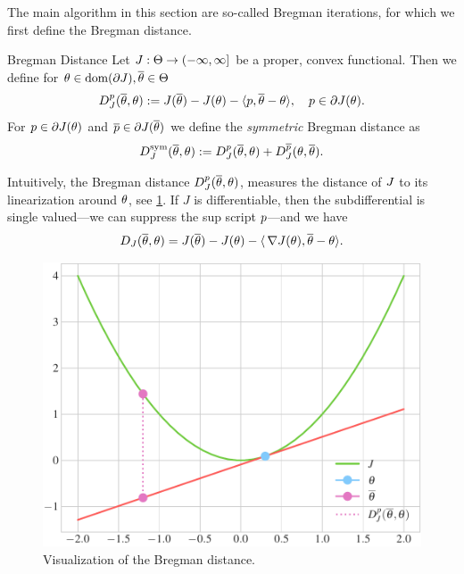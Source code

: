 The main algorithm in this section are so-called Bregman iterations, for which we first define the Bregman distance.
%
\begin{definition}{Bregman Distance}{}
	Let $J:\Theta\to(-\infty,\infty]$ be a proper, convex functional. Then we define for $\theta\in\operatorname{dom}(\partial J),\overline{\theta}\in\Theta$
	\begin{align}\label{eq:bregman_distance}
		D^p_J(\overline{\theta},\theta) := J(\overline {\theta})-J({\theta})-\langle p,\overline{\theta}-{\theta}\rangle,\quad p\in\partial J(\theta).
	\end{align}
	For $p\in\partial J({\theta})$ and $\overline{p}\in\partial J(\overline{\theta})$ we define the \emph{symmetric} Bregman distance as
	\begin{align}
		D^\mathrm{sym}_J(\overline{\theta},\theta) := D^p_J(\overline{\theta},\theta) + D^{\overline{p}}_J(\theta,\overline{\theta}).
	\end{align}
\end{definition}
Intuitively, the Bregman distance $D^p_J(\overline{\theta},\theta)$, measures the distance of $J$ to its linearization around $\theta$, see \cref{fig:Bregdist}. If $J$ is differentiable, then the subdifferential is single valued---we can suppress the sup script $p$---and we have
%
\begin{align*}
	D_J(\overline{\theta},\theta) = J(\overline {\theta})-J({\theta})-\langle\,\nabla J(\theta), \overline{\theta}-{\theta}\rangle.
\end{align*}
%
\begin{figure}
	\centering
	\includegraphics[width=.7\textwidth]{code/Bregman/lin_dist.pdf}
	\caption{Visualization of the Bregman distance.}\label{fig:Bregdist}
\end{figure}
